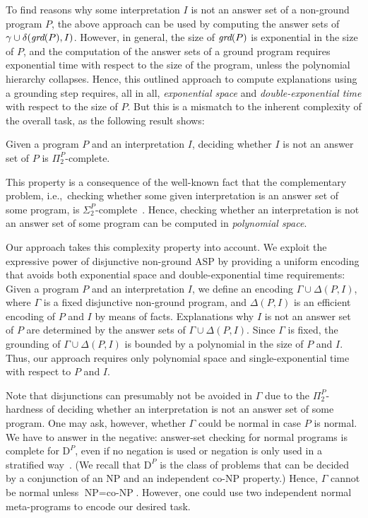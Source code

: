 \documentclass{tlp}
\newcommand{\meta}{\Gamma}
\newcommand{\reif}[1]{\Delta(#1)}
\newcommand{\grd}{\mathit{ground}}
\renewcommand{\grd}{\mathit{grd}}
\newcommand{\iec}{i.e.,\ }
\newcommand{\NP}{\mbox{NP}}
\newcommand{\coNP}{\mbox{co-NP}}
\newcommand{\D}{\mbox{D}}
\renewcommand{\mathit}[1]{{\text{\it{#1}}}}
\begin{document}
To find reasons why some interpretation $I$ is not an answer set of a non-ground program $P$, 
the above approach can be used by computing the answer sets of $\gamma \cup \delta(\grd(P),I)$.
However, in general, the size of $\grd(P)$ is exponential in the size of $P$, and the computation 
of the answer sets of a ground program requires exponential time with respect
to the size of the program, unless the polynomial hierarchy collapses.
Hence, this outlined approach to compute explanations using a grounding step requires, all in all, \emph{exponential space} and \emph{double-exponential time} with respect to the size of $P$.
But this is a mismatch to the inherent complexity of the overall task, as the following result shows: 

\begin{proposition}
\label{prop:complexity}
Given a program $P$ and an interpretation $I$, deciding whether $I$ is not an answer set of $P$ is $\Pi^P_2$-complete. 
\end{proposition}
This property is a consequence of the well-known fact that the complementary problem, \iec checking whether some given interpretation is an answer set of some program, is $\Sigma^{P}_{2}$-complete~\cite{eiter04}.
Hence, checking whether an interpretation is not an answer set of some program 
can be computed in \emph{polynomial space}.

Our approach takes this complexity property into account.  We exploit the expressive power of disjunctive non-ground ASP by providing a
uniform encoding that avoids both exponential space and double-exponential time requirements:
Given a program $P$ and an interpretation $I$, we define an encoding $\meta \cup \reif{P,I}$, where $\meta$ is a fixed disjunctive non-ground program, and $\reif{P,I}$ is an efficient encoding  of $P$ and $I$ by means of facts.
Explanations why $I$ is not an answer set of $P$ are determined by the answer sets of $\meta \cup \reif{P,I}$.
Since $\meta$ is fixed, the grounding of $\meta \cup \reif{P,I}$ is bounded by a polynomial in the size of $P$ and $I$. Thus, our
approach requires only polynomial space and single-exponential time with respect to $P$ and $I$.

Note that disjunctions can presumably not be avoided in $\meta$ due to the  $\Pi^{P}_{2}$-hardness of 
deciding whether an interpretation is not an answer set of some program.
One may ask, however, whether $\meta$ could be normal in case $P$ is normal.
We have to answer in the negative: answer-set checking for normal programs is complete for $\D^{P}$, 
even if no negation is used or negation is only used in a stratified way~\cite{eiter04}.
(We recall that $\D^{P}$ is the class of problems that  can be  decided by a conjunction
of an $\NP$ and an independent  $\coNP$ property.)
Hence, $\meta$ cannot be normal unless $\NP = \coNP$.
However, one could use two independent normal meta-programs to encode our desired task.
\end{document}
